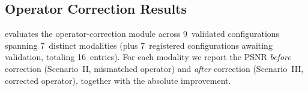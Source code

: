 \subsection{Operator Correction Results}
\label{subsec:correction}

 evaluates the \pwm{} operator-correction module
across 9~validated configurations spanning 7~distinct modalities (plus 7~registered configurations awaiting validation, totaling 16~entries).  For each modality we report the PSNR
\emph{before} correction (Scenario~II, mismatched operator) and
\emph{after} correction (Scenario~III, corrected operator), together
with the absolute improvement.

